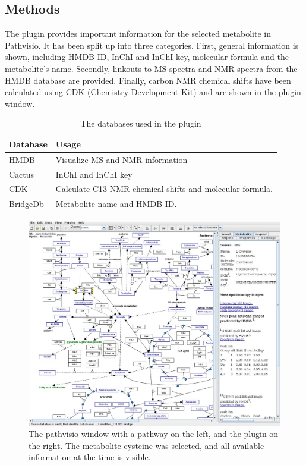 \documentclass{bioinfo}
\begin{document}
\begin{methods}
\section{Methods}


The plugin provides important information for the selected metabolite in Pathvisio. It has been split up into three categories. First, general information is shown, including HMDB ID, InChI and InChI key, molecular formula and the metabolite's name. Secondly, linkouts to MS spectra and NMR spectra from the HMDB database are provided. Finally, carbon NMR chemical shifts have been calculated using CDK (Chemistry Development Kit) and are shown in the plugin window.

\begin{table}[ht]
\caption{The databases used in the plugin \cite{cdk} \cite{hmdb} \cite{bridge}}
\centering  %
\begin{tabular}{p{1cm}p{7cm}}
\hline\hline   
Database & Usage \\ [0.5ex] 
\hline         
HMDB & Visualize MS and NMR information\\
Cactus & InChI and InChI key\\
CDK & Calculate C13 NMR chemical shifts and molecular formula.\\
BridgeDb & Metabolite name and HMDB ID. \\ [1ex] 
\hline 
\end{tabular}
\end{table}

\end{methods}

\begin{figure}[!tpb]%
\centerline{\includegraphics[width=18cm]{figure1.png}}
\caption{The pathvisio window with a pathway on the left, and the plugin on the right. The metabolite cysteine was selected, and all available information at the time is visible.}\label{fig:01}
\end{figure}
\end{document}
